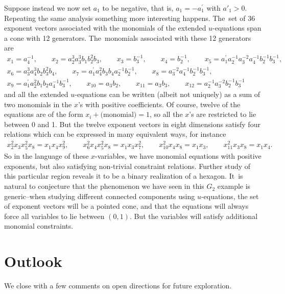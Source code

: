 \documentclass[pdftex]{sigma}%
\numberwithin{equation}{section}
\begin{document}
Suppose instead we now set $a_1$ to be negative, that is, $a_1 = -a^\prime_1$ with $a'_1 >0$. Repeating the same analysis something more interesting happens. The~set of 36 exponent vectors associated with the monomials of the extended $u$-equations span a cone with 12 generators. The~monomials associated with these 12 generators are
\begin{gather*}
x_1 = a_4^{-1}, \qquad\!
x_2=a_2^3 a_3^3 b_1 b_2^2 b_3, \qquad
x_3=b_3^{-1},\qquad \!
x_4=b_2^{-1},\qquad \!
x_5=a^\prime_1 a_2^{-1}a_3^{-2} a_4^{-1} b_2^{-1} b_3^{-1},
\\
x_6 =a_3^3 a_4^3 b_2 b_3^2 b_4, \qquad
x_7 = a^\prime_1 a_4^2 b_3 b_4 a_2^{-1} b_2^{-1}, \qquad
x_8=a_3^{-2} a_4^{-1} b_2^{-1} b_3^{-1},
\\
x_{9} = a^\prime_1 a_2^2 b_1 b_2 a_4^{-1} b_3^{-1}, \qquad
x_{10}=a_3 b_2, \qquad
x_{11} = a_3 b_3, \qquad
x_{12} = a_2^{-1} a_3^{-2} b_2^{-1} b_3^{-1}
\end{gather*}
and all the extended $u$-equations can be written (albeit not uniquely) as a sum of two monomials in the $x$'s with positive coefficients. Of course, twelve of the equations are of the form $x_i + \text{(monomial)} = 1$, so all the $x$'s are restricted to lie between 0 and 1. But the twelve exponent vectors in eight dimensions satisfy four relations which can be expressed in many equivalent ways, for instance
\begin{gather*}
x_2^2 x_3 x_5^2 x_8=x_1 x_4 x_9^2, \qquad x_6^2 x_4 x_5^2 x_8 = x_1 x_3 x_7^2, \qquad x_{10}^2 x_4 x_8 = x_1 x_3, \qquad x_{11}^2 x_3 x_8 = x_1 x_4.
\end{gather*}
So in the language of these $x$-variables, we have monomial equations with positive exponents, but also satisfying non-trivial constraint relations. Further study of this particular region reveals it to be a binary realization of a hexagon. It~is natural to conjecture that the phenomenon we have seen in this $G_2$ example is generic--when studying different connected components using $u$-equations, the set of exponent vectors will be a pointed cone, and that the equations will always force all variables to lie between $(0,1)$. But the variables will satisfy additional monomial constraints.

\section{Outlook}

We close with a few comments on open directions for future exploration.
\end{document}
